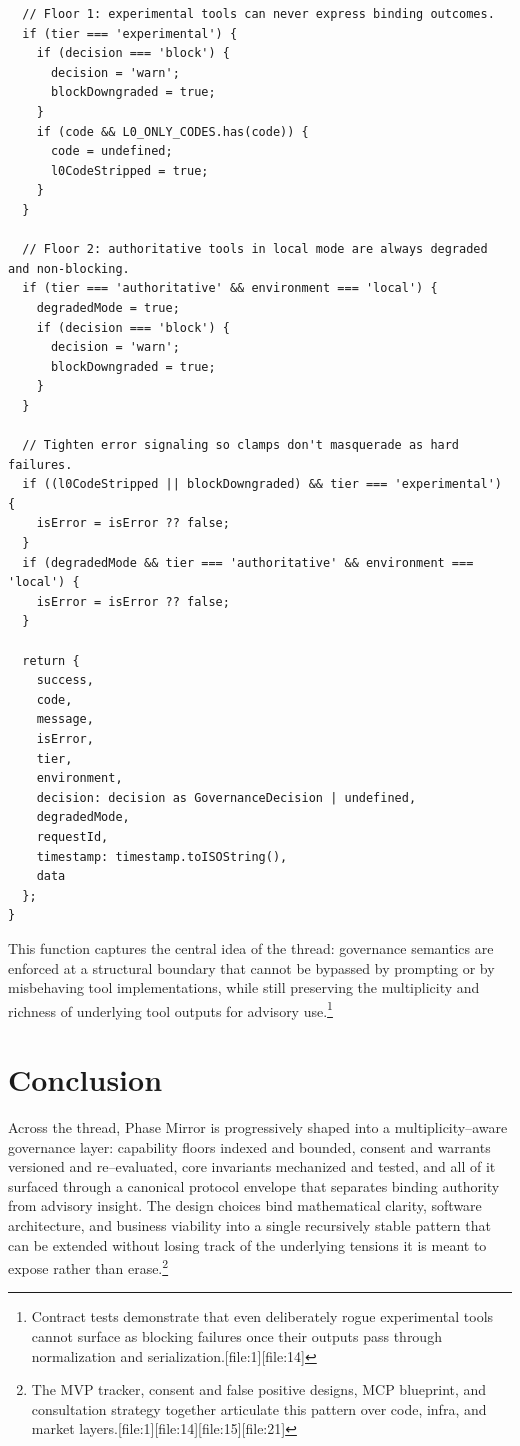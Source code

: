 \documentclass[11pt]{article}
\begin{document}
\begin{lstlisting}
  // Floor 1: experimental tools can never express binding outcomes.
  if (tier === 'experimental') {
    if (decision === 'block') {
      decision = 'warn';
      blockDowngraded = true;
    }
    if (code && L0_ONLY_CODES.has(code)) {
      code = undefined;
      l0CodeStripped = true;
    }
  }

  // Floor 2: authoritative tools in local mode are always degraded and non-blocking.
  if (tier === 'authoritative' && environment === 'local') {
    degradedMode = true;
    if (decision === 'block') {
      decision = 'warn';
      blockDowngraded = true;
    }
  }

  // Tighten error signaling so clamps don't masquerade as hard failures.
  if ((l0CodeStripped || blockDowngraded) && tier === 'experimental') {
    isError = isError ?? false;
  }
  if (degradedMode && tier === 'authoritative' && environment === 'local') {
    isError = isError ?? false;
  }

  return {
    success,
    code,
    message,
    isError,
    tier,
    environment,
    decision: decision as GovernanceDecision | undefined,
    degradedMode,
    requestId,
    timestamp: timestamp.toISOString(),
    data
  };
}
\end{lstlisting}

This function captures the central idea of the thread: governance semantics are enforced at a structural boundary that cannot be bypassed by prompting or by misbehaving tool implementations, while still preserving the multiplicity and richness of underlying tool outputs for advisory use.\footnote{Contract tests demonstrate that even deliberately rogue experimental tools cannot surface as blocking failures once their outputs pass through normalization and serialization.[file:1][file:14]} 

\section{Conclusion}

Across the thread, Phase Mirror is progressively shaped into a multiplicity--aware governance layer: capability floors indexed and bounded, consent and warrants versioned and re--evaluated, core invariants mechanized and tested, and all of it surfaced through a canonical protocol envelope that separates binding authority from advisory insight. The design choices bind mathematical clarity, software architecture, and business viability into a single recursively stable pattern that can be extended without losing track of the underlying tensions it is meant to expose rather than erase.\footnote{The MVP tracker, consent and false positive designs, MCP blueprint, and consultation strategy together articulate this pattern over code, infra, and market layers.[file:1][file:14][file:15][file:21]} 
\end{document}
